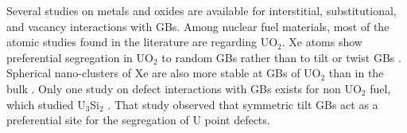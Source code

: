 \documentclass[review]{elsarticle}
\begin{document}
Several studies on metals and oxides are available for interstitial, substitutional, and vacancy interactions with GBs. Among nuclear fuel materials, most of the atomic studies found in the literature are regarding UO$_\mathrm{2}$. Xe atoms show preferential segregation in UO$_\mathrm{2}$ to random GBs rather than to tilt or twist GBs \cite{PhysRevB.84.174105_Xe_UO2, met12050763_Xe_Uo2}. Spherical nano-clusters of Xe are also more stable at GBs of UO$_\mathrm{2}$ than in the bulk \cite{PhysRevB.81.174111_Xe_UO2_clus}. Only one study on defect interactions with GBs exists for non UO$_\mathrm{2}$ fuel, which studied U$_\mathrm{3}$Si$_\mathrm{2}$ \cite{beelerUSi}. That study observed that symmetric tilt GBs act as a preferential site for the segregation of U point defects. 

\end{document}
